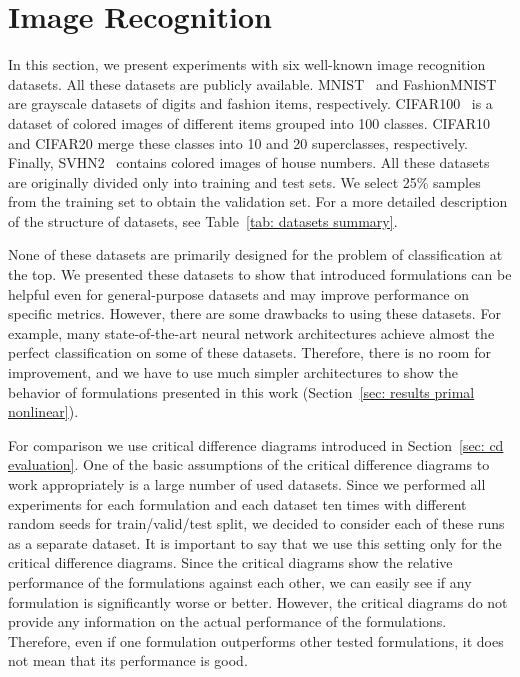 \section{Image Recognition}\label{sec: image recognition}

In this section, we present experiments with six well-known image recognition datasets. All these datasets are publicly available. MNIST~\cite{deng2012mnist} and FashionMNIST~\cite{xiao2017fashionmnist} are grayscale datasets of digits and fashion items, respectively. CIFAR100~\cite{krizhevsky2009learning} is a dataset of colored images of different items grouped into 100 classes. CIFAR10 and CIFAR20 merge these classes into 10 and 20 superclasses, respectively. Finally, SVHN2~\cite{netzer2011reading} contains colored images of house numbers. All these datasets are originally divided only into training and test sets. We select 25\% samples from the training set to obtain the validation set. For a more detailed description of the structure of datasets, see Table~\ref{tab: datasets summary}.

None of these datasets are primarily designed for the problem of classification at the top. We presented these datasets to show that introduced formulations can be helpful even for general-purpose datasets and may improve performance on specific metrics. However, there are some drawbacks to using these datasets. For example, many state-of-the-art neural network architectures achieve almost the perfect classification on some of these datasets. Therefore, there is no room for improvement, and we have to use much simpler architectures to show the behavior of formulations presented in this work (Section~\ref{sec: results primal nonlinear}).

For comparison we use critical difference diagrams introduced in Section~\ref{sec: cd evaluation}. One of the basic assumptions of the critical difference diagrams to work appropriately is a large number of used datasets. Since we performed all experiments for each formulation and each dataset ten times with different random seeds for train/valid/test split, we decided to consider each of these runs as a separate dataset. It is important to say that we use this setting only for the critical difference diagrams. Since the critical diagrams show the relative performance of the formulations against each other, we can easily see if any formulation is significantly worse or better. However, the critical diagrams do not provide any information on the actual performance of the formulations. Therefore, even if one formulation outperforms other tested formulations, it does not mean that its performance is good.

